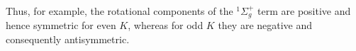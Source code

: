 Thus, for example, the rotational components of the ${}^1\Sigma_g^+$ term are positive and hence symmetric for even $K$, whereas for odd $K$ they are negative and consequently antisymmetric.
